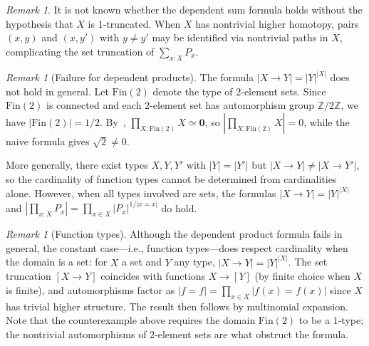 \documentclass[12pt]{amsart}
\newcommand{\Fin}{\mathrm{Fin}}
\theoremstyle{plain}
\theoremstyle{definition}
\theoremstyle{remark}
\newtheorem{remark}[theorem]{Remark}
\begin{document}
\begin{remark}\label{rem:depsum-open}
It is not known whether the dependent sum formula holds without the hypothesis that $X$ is $1$-truncated. When $X$ has nontrivial higher homotopy, pairs $(x,y)$ and $(x,y')$ with $y\neq y'$ may be identified via nontrivial paths in $X$, complicating the set truncation of $\sum_{x:X}P_x$.
\end{remark}

\begin{remark}[Failure for dependent products]\label{rem:counterexample}
The formula $|X\to Y| = |Y|^{|X|}$ does not hold in general. Let $\Fin(2)$ denote the type of $2$-element sets. Since $\Fin(2)$ is connected and each $2$-element set has automorphism group $\mathbb{Z}/2\mathbb{Z}$, we have $|\Fin(2)|=1/2$. By~\cite[Corollary~17.5.2]{rijke2022introduction}, $\prod_{X:\Fin(2)}X\simeq\mathbf{0}$, so $|\prod_{X:\Fin(2)}X|=0$, while the naive formula gives $\sqrt{2}\neq 0$.

More generally, there exist types $X,Y,Y'$ with $|Y|=|Y'|$ but $|X\to Y|\neq|X\to Y'|$, so the cardinality of function types cannot be determined from cardinalities alone. However, when all types involved are sets, the formulas $|X\to Y|=|Y|^{|X|}$ and $|\prod_{x:X}P_x|=\prod_{x\in X}|P_x|^{1/|x=x|}$ do hold.
\end{remark}

\begin{remark}[Function types]\label{rem:function-types}
Although the dependent product formula fails in general, the constant case---i.e., function types---does respect cardinality when the domain is a set: for $X$ a set and $Y$ any type, $|X\to Y| = |Y|^{|X|}$. The set truncation $[X\to Y]$ coincides with functions $X\to[Y]$ (by finite choice when $X$ is finite), and automorphisms factor as $|f=f| = \prod_{x\in X}|f(x)=f(x)|$ since $X$ has trivial higher structure. The result then follows by multinomial expansion. Note that the counterexample above requires the domain $\Fin(2)$ to be a $1$-type; the nontrivial automorphisms of $2$-element sets are what obstruct the formula.
\end{remark}
\end{document}
